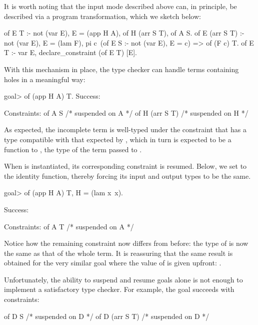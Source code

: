 \documentclass{these-ISSS}
\newenvironment{elpicode}
  {\VerbatimEnvironment\begin{elpibox}\begin{xelpicode}}{\end{xelpicode}
\end{elpibox}}
\newenvironment{elpioutput}
  {\VerbatimEnvironment\begin{outputbox}\begin{xelpicode}}{\end{xelpicode}
\end{outputbox}}
\begin{document}
It is worth noting that the input mode described above can, in principle, be
described via a program transformation, which we sketch below:

\begin{elpicode}
of E T :- not (var E), E = (app H A), of H (arr S T), of A S.
of E (arr S T) :- not (var E), E = (lam F),
  pi c\ (of E S :- not (var E), E = c) => of (F c) T.
of E T :- var E, declare_constraint (of E T) [E].
\end{elpicode}


With this mechanism in place, the type checker can handle terms containing
holes in a meaningful way:

\begin{elpioutput}
goal> of (app H A) T.
Success:

Constraints:
  of A S  /* suspended on A */
  of H (arr S T)  /* suspended on H */
\end{elpioutput}

As expected, the incomplete term is well-typed under the constraint that
 has a type compatible with that expected by , which in turn
is expected to be a function to , the type of the term passed to
.

When  is instantiated, its corresponding constraint is resumed.
Below, we set  to the identity function, thereby forcing its input
and output types to be the same.

\begin{elpioutput}
goal> of (app H A) T, H = (lam x\ x).

Success:

Constraints:
  of A T  /* suspended on A */
\end{elpioutput}

Notice how the remaining constraint now differs from before: the type of
 is now the same  as that of the whole term.
It is reassuring that the same result is obtained for the very similar goal
where the value of  is given upfront: .

Unfortunately, the ability to suspend and resume goals alone is not enough to
implement a satisfactory type checker. For example, the goal
 succeeds with constraints:

\begin{elpicode}
  of D S  /* suspended on D */
  of D (arr S T)  /* suspended on D */
\end{elpicode}
\end{document}
